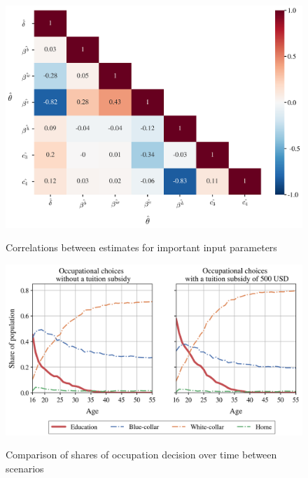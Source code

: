 \begin{figure}[H]
	\caption{Correlations between estimates for important input parameters}
	\centering
	\includegraphics[scale=0.45]{../scrypy/figures/heatmap}
	\label{fig:corr}
\end{figure}
\newpage
\vspace{10mm} %
\begin{figure}[H]
	\caption{Comparison of shares of occupation decision over time between scenarios}
	\centering
	\includegraphics[scale=0.75]{../scrypy/figures/occ_choice_shares}
	\label{fig:paths}
\end{figure}

\vspace{10mm} %

